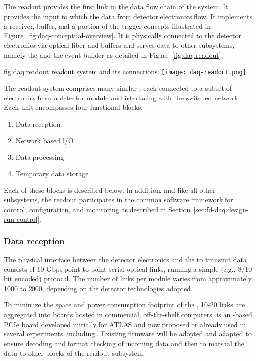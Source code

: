 The readout provides the first link in the data flow chain of the  system.
It provides the input to which the data from detector electronics flow.
It implements a receiver, buffer, and a portion of the trigger concepts illustrated in Figure~\ref{fig:daq-conceptual-overview}.
It is physically connected to the detector electronics via optical fiber and buffers and serves data to other  subsystems, namely the  and the event builder as detailed in Figure~\ref{fig:daq:readout}.


\begin{dunefigure}{fig:daq:readout}{  readout system and its connections.}
  \texttt{[image: daq-readout.png]}
\end{dunefigure}

The readout system comprises many similar , each connected to a subset of electronics from a detector module and interfacing with the  switched network.  Each unit encompasses four functional blocks:

\begin{enumerate}
\item Data reception
\item Network based I/O
\item Data processing
\item Temporary data storage
\end{enumerate}

Each of these blocks is described below.  In addition, and like all other  subsystems, the readout participates in the common software framework for control, configuration, and monitoring as described in Section~\ref{sec:fd-daq:design-run-control}.

\subsubsection{Data reception}

The physical interface between the detector electronics and the  to transmit data consists of 10 Gbps point-to-point serial optical links, running a simple (e.g., 8/10 bit encoded) protocol. 
The number of links per  module varies from approximately 1000 to 2000, depending on the detector technologies adopted.

To minimize the space and power consumption footprint of the , 10-20 links are aggregated into  boards hosted in commercial, off-the-shelf computers.
 is an -based PCIe board developed initially for ATLAS and now proposed or already used in several experiments, including . 
Existing firmware will be adopted and adapted to ensure decoding and format checking of incoming data and then to marshal the data to other blocks of the readout subsystem.

